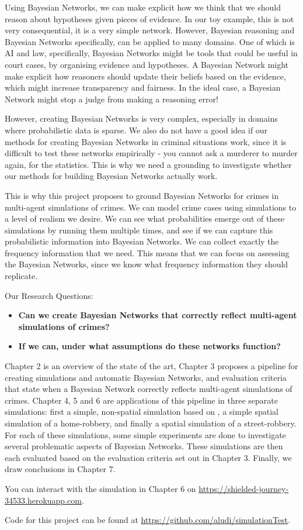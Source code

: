 Using Bayesian Networks, we can make explicit how we think that we should reason about hypotheses given pieces of evidence. In our toy example, this is not very consequential, it is a very simple network. However, Bayesian reasoning and Bayesian Networks specifically, can be applied to many domains. One of which is AI and law, specifically, Bayesian Networks might be tools that could be useful in court cases, by organising evidence and hypotheses. A Bayesian Network might make explicit how reasoners should update their beliefs based on the evidence, which might increase transparency and fairness. In the ideal case, a Bayesian Network might stop a judge from making a reasoning error!

However, creating Bayesian Networks is very complex, especially in domains where probabilistic data is sparse. We also do not have a good idea if our methods for creating Bayesian Networks in criminal situations work, since it is difficult to test these networks empirically - you cannot ask a murderer to murder again, for the statistics. This is why we need a grounding to investigate whether our methods for building Bayesian Networks actually work.

This is why this project proposes to ground Bayesian Networks for crimes in multi-agent simulations of crimes. We can model crime cases using simulations to a level of realism we desire. We can see what probabilities emerge out of these simulations by running them multiple times, and see if we can capture this probabilistic information into Bayesian Networks. We can collect exactly the frequency information that we need. This means that we can focus on assessing the Bayesian Networks, since we know what frequency information they should replicate.

Our Research Questions:
\begin{itemize}
\item \textbf{Can we create Bayesian Networks that correctly reflect multi-agent simulations of crimes?}
\item \textbf{If we can, under what assumptions do these networks function?}
\end{itemize}



Chapter 2 is an overview of the state of the art, Chapter 3 proposes a pipeline for creating simulations and automatic Bayesian Networks, and evaluation criteria that state when a Bayesian Network correctly reflects multi-agent simulations of crimes. Chapter 4, 5 and 6 are applications of this pipeline in three separate simulations: first a simple, non-spatial simulation based on \citep{Vlek2015}, a simple spatial simulation of a home-robbery, and finally a spatial simulation of a street-robbery. For each of these simulations, some simple experiments are done to investigate several problematic aspects of Bayesian Networks. These simulations are then each evaluated based on the evaluation criteria set out in Chapter 3. Finally, we draw conclusions in Chapter 7. 

You can interact with the simulation in Chapter 6 on \url{https://shielded-journey-34533.herokuapp.com}.

Code for this project can be found at \url{https://github.com/aludi/simulationTest}.
